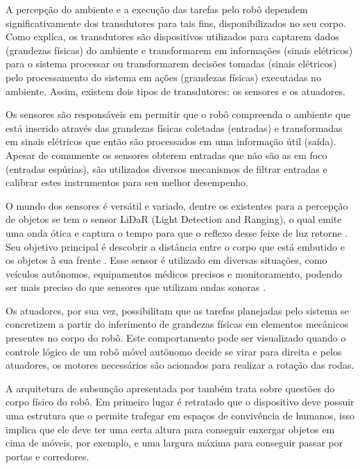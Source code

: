 A percepção do ambiente e a execução das tarefas pelo robô dependem significativamente dos transdutores para tais fins, disponibilizados no seu corpo. Como \citet{instrumentacao:2013} explica, os transdutores são dispositivos utilizados para captarem dados (grandezas físicas)  do ambiente e transformarem em informações (sinais elétricos) para o sistema processar ou transformarem decisões tomadas (sinais elétricos) pelo processamento do sistema em ações (grandezas físicas) executadas no ambiente. Assim, existem dois tipos de transdutores: os sensores e os atuadores. 

Os sensores são responsáveis em permitir que o robô compreenda o ambiente que está inserido através das grandezas físicas coletadas (entradas) e transformadas em sinais elétricos que então são processados em uma informação útil (saída). Apesar de comumente os sensores obterem entradas que não são as em foco (entradas espúrias), são utilizados diversos mecanismos de filtrar entradas e calibrar estes instrumentos para seu melhor desempenho. 

O mundo dos sensores  é versátil e variado, dentre os existentes para a percepção de objetos se tem o sensor LiDaR (Light Detection and Ranging), o qual emite uma onda ótica e captura o tempo para que o reflexo desse feixe de luz retorne \cite{lidarComparative:2021, lidarProgress:2022}. Seu objetivo principal é descobrir a distância entre o corpo que está embutido e os objetos à sua frente \cite{lidarProgress:2022, lidarComparative:2021}. Esse sensor é utilizado em diversas situações, como veículos autônomos, equipamentos médicos precisos e monitoramento, podendo ser mais preciso do que sensores que utilizam ondas sonoras \cite{lidarProgress:2022, lidarDetection:2019}.

Os atuadores, por sua vez, possibilitam que as tarefas planejadas pelo sistema se concretizem a partir do inferimento de grandezas físicas em elementos mecânicos presentes no corpo do robô. Este comportamento pode ser visualizado quando o controle lógico de um robô móvel autônomo decide se virar para direita e pelos atuadores, os motores necessários são acionados para realizar a rotação das rodas.  

A arquitetura de subsunção apresentada por \citet{brooks85} também trata sobre questões do corpo físico do robô. Em primeiro lugar é retratado que o dispositivo deve possuir uma estrutura que o permite trafegar em espaços de convivência de humanos, isso implica que ele deve ter uma certa altura para conseguir enxergar objetos em cima de móveis, por exemplo, e uma largura máxima para conseguir passar por portas e corredores. 

